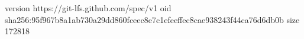 version https://git-lfs.github.com/spec/v1
oid sha256:95f967b8a1ab730a29dd860fceec8e7c1efeeffec8cae938243f44ca76d6db0b
size 172818
